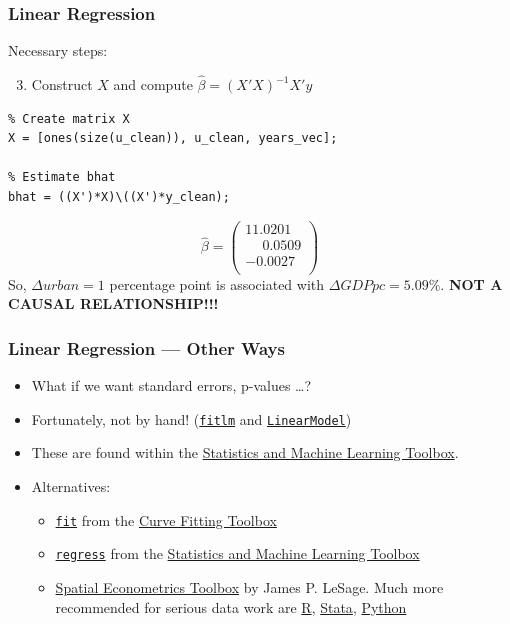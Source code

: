\documentclass[11pt,xcolor={svgnames},aspectratio=169,usepdftitle=false,notheorems]{beamer}
\begin{document}
\begin{frame}[fragile]
  \frametitle{Linear Regression}
Necessary steps:
\begin{enumerate}
  \setcounter{enumi}{2}
  \item Construct $X$ and compute $\hat{\beta} = (X'X)^{-1}X'y$
\end{enumerate}
\begin{lstlisting}
% Create matrix X
X = [ones(size(u_clean)), u_clean, years_vec];

% Estimate bhat
bhat = ((X')*X)\((X')*y_clean);
\end{lstlisting}
\[
\hat{\beta} = \begin{pmatrix}
11.0201 \\
\phantom{-}0.0509  \\
-0.0027 \\
\end{pmatrix}
\]
So, $\Delta urban = 1$ percentage point is associated with $\Delta GDPpc =  5.09\%$. \alert{\textbf{NOT A CAUSAL RELATIONSHIP!!!}}
\end{frame}

\begin{frame}[fragile]
  \frametitle{Linear Regression --- Other Ways}
\begin{itemize}
  \item What if we want standard errors, p-values \ldots ?
  \item Fortunately, not by hand! (\href{https://www.mathworks.com/help/stats/fitlm.html?s_tid=doc_ta}{\texttt{fitlm}} and \href{https://www.mathworks.com/help/stats/linearmodel.html}{\texttt{LinearModel}})
  \item These are found within the \href{https://www.mathworks.com/help/stats/index.html?s_tid=CRUX_lftnav}{Statistics and Machine Learning Toolbox}.
  \item Alternatives:
  \begin{itemize}
    \item \href{https://www.mathworks.com/help/curvefit/fit.html?s_tid=doc_ta}{\texttt{fit}} from the \href{https://www.mathworks.com/help/curvefit/index.html?s_tid=CRUX_lftnav}{Curve Fitting Toolbox}
    \item \href{https://www.mathworks.com/help/stats/regress.html}{\texttt{regress}} from the \href{https://www.mathworks.com/help/stats/index.html?s_tid=CRUX_lftnav}{Statistics and Machine Learning Toolbox}
    \item \href{https://www.spatial-econometrics.com/}{Spatial Econometrics Toolbox} by James P. LeSage. Much more recommended for serious data work are \href{https://www.r-project.org/}{R}, \href{https://www.stata.com/}{Stata}, \href{https://www.python.org/}{Python}
  \end{itemize}
\end{itemize}
\end{frame}
\end{document}
